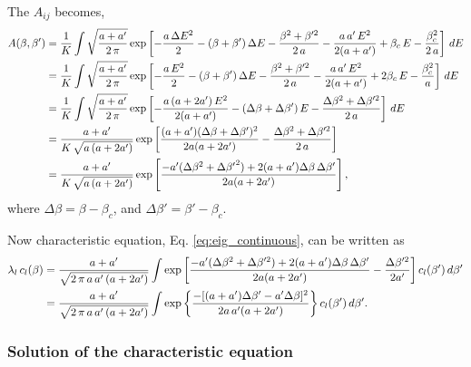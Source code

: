 \documentclass[aip,jcp,preprint,notitlepage, superscriptaddress]{revtex4-1}
\begin{document}
The $A_{ij}$ becomes,
%
%
%
\begin{align*}
A(\beta, \beta')
&=
\frac 1 K
\int
\sqrt \frac { a + a' } { 2 \, \pi }
\exp\left[
-\frac{ a \, \Delta E^2 } { 2 }
-(\beta + \beta') \, \Delta E
-
\frac{
  \beta^2 + \beta'^2
} { 2 \, a}
-
\frac{
  a \, a' \, E^2
}
{
  2 (a + a')
}
+\beta_c \, E
-
\frac{\beta_c^2}{2 \, a}
\right]
\, dE
\notag \\
%
%
%
&=
\frac 1 K
\int
\sqrt \frac { a + a' } { 2 \, \pi }
\exp\left[
-\frac{
  a \, E^2
}
{
  2
}
-(\beta + \beta') \, \Delta E
-
\frac{
  \beta^2 + \beta'^2
} { 2 \, a}
-
\frac{
  a \, a' \, E^2
}
{
  2 (a + a')
}
+2\beta_c \, E
-
\frac{\beta_c^2}{a}
\right]
\, dE
\notag \\
%
%
%
&=
\frac 1 K
\int
\sqrt \frac { a + a' } { 2 \, \pi }
\exp\left[
-\frac{
  a \, (a + 2a') \, E^2
}
{
  2 (a + a')
}
-(\Delta \beta + \Delta \beta') \, E
-
\frac{
  \Delta \beta^2 + \Delta \beta'^2
} { 2 \, a}
\right]
\, dE
\notag \\
%
%
%
&=
\frac{ a + a' } { K \, \sqrt{ a \, (a + 2 a')} }
\exp\left[
  \frac{
    (a+a') (\Delta \beta + \Delta \beta')^2
  }
  {
    2 a (a + 2 a')
  }
  -
  \frac{
    \Delta \beta^2 + \Delta \beta'^2
  } { 2 \, a}
\right]
\notag\\
%
%
%
&=
\frac{ a + a' } { K \, \sqrt{a \, ( a + 2 a') } }
\exp\left[
  \frac{
    -a' (\Delta \beta^2 + \Delta {\beta'}^2)
    +2(a+a') \Delta \beta \, \Delta \beta'
  }
  {
    2 a (a + 2 a')
  }
\right],
\end{align*}
where
$\Delta \beta = \beta - \beta_c$,
and
$\Delta \beta' = \beta' - \beta_c$.



Now characteristic equation,
Eq. \eqref{eq:eig_continuous},
can be written as
%
\begin{align}
\lambda_l \, c_l(\beta)
&=
\frac{ a + a' } { \sqrt{2 \, \pi \, a \, a' \, (a + 2 a')} }
\int
\exp\left[
  \frac{
    -a' (\Delta \beta^2 + \Delta \beta'^2)
    +2(a+a') \Delta \beta \, \Delta \beta'
  }
  {
    2 a (a + 2 a')
  }
  -\frac{
    \Delta \beta'^2
  } { 2 a'}
\right]
c_l(\beta') \, d\beta'
\notag
\\
&=
\frac{ a + a' } { \sqrt{2 \, \pi \, a \, a' \, (a + 2 a')} }
\int
\exp\left\{
  \frac{
    -[(a + a') \Delta \beta' - a' \Delta \beta]^2
  }
  {
    2 a \, a' (a + 2 a')
  }
\right\}
c_l(\beta') \, d\beta'.
\label{eq:eig_Gaussian1}
\end{align}
%



\subsubsection{Solution of the characteristic equation}
\end{document}

